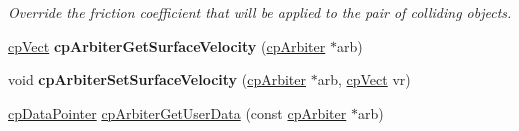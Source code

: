 \begin{DoxyCompactItemize}
\begin{DoxyCompactList}\small\item\em Override the friction coefficient that will be applied to the pair of colliding objects. \end{DoxyCompactList}\item 
\hypertarget{group__cp_arbiter_ga4f9919eac87d054d11b095ba348ffffd}{}\hyperlink{structcp_vect}{cp\+Vect} {\bfseries cp\+Arbiter\+Get\+Surface\+Velocity} (\hyperlink{structcp_arbiter}{cp\+Arbiter} $\ast$arb)\label{group__cp_arbiter_ga4f9919eac87d054d11b095ba348ffffd}

\item 
\hypertarget{group__cp_arbiter_ga880fecaa9ab34831ecd8b56a52fc9633}{}void {\bfseries cp\+Arbiter\+Set\+Surface\+Velocity} (\hyperlink{structcp_arbiter}{cp\+Arbiter} $\ast$arb, \hyperlink{structcp_vect}{cp\+Vect} vr)\label{group__cp_arbiter_ga880fecaa9ab34831ecd8b56a52fc9633}

\item 
\hypertarget{group__cp_arbiter_ga9734f6ed4771350c607644ab5d4b93bd}{}\hyperlink{group__basic_types_ga2ac2c3c31e21893941f9e4f8ee279447}{cp\+Data\+Pointer} \hyperlink{group__cp_arbiter_ga9734f6ed4771350c607644ab5d4b93bd}{cp\+Arbiter\+Get\+User\+Data} (const \hyperlink{structcp_arbiter}{cp\+Arbiter} $\ast$arb)\label{group__cp_arbiter_ga9734f6ed4771350c607644ab5d4b93bd}


\end{DoxyCompactItemize}
